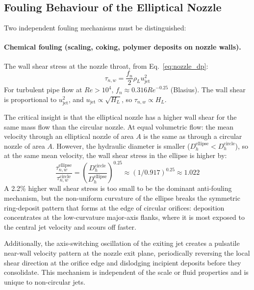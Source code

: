 \documentclass[11pt,letterpaper]{article}
\newcommand{\rhoL}{\rho_L}
\newcommand{\ujet}{u_{\mathrm{jet}}}
\newcommand{\Rey}{\mathit{Re}}
\begin{document}
\subsection{Fouling Behaviour of the Elliptical Nozzle}
\label{sec:fouling}

Two independent fouling mechanisms must be distinguished:

\paragraph{Chemical fouling (scaling, coking, polymer deposits on nozzle walls).}
The wall shear stress at the nozzle throat, from Eq.~\eqref{eq:nozzle_dp}:
\begin{equation}
  \tau_{n,w} = \frac{f_n}{2}\rhoL \ujet^2
  \label{eq:tau_nozzle}
\end{equation}
For turbulent pipe flow at $\Rey > 10^4$, $f_n \approx 0.316\Rey^{-0.25}$
(Blasius).  The wall shear is proportional to $\ujet^2$, and $\ujet
\propto \sqrt{H_L}$, so $\tau_{n,w} \propto H_L$.

The critical insight is that the elliptical nozzle has a higher wall shear
for the same mass flow than the circular nozzle.  At equal volumetric flow:
the mean velocity through an elliptical nozzle of area $A$ is the same as
through a circular nozzle of area $A$.  However, the hydraulic diameter is
smaller ($D_h^{\mathrm{ellipse}} < D_h^{\mathrm{circle}}$), so at the same
mean velocity, the wall shear stress in the ellipse is higher by:
\begin{equation}
  \frac{\tau_{n,w}^{\mathrm{ellipse}}}{\tau_{n,w}^{\mathrm{circle}}}
  = \left(\frac{D_h^{\mathrm{circle}}}{D_h^{\mathrm{ellipse}}}\right)^{0.25}
  \approx (1/0.917)^{0.25} \approx 1.022
  \label{eq:shear_ratio}
\end{equation}
A 2.2\% higher wall shear stress is too small to be the dominant
anti-fouling mechanism, but the non-uniform curvature of the ellipse
breaks the symmetric ring-deposit pattern that forms at the edge of circular
orifices: deposition concentrates at the low-curvature major-axis flanks,
where it is most exposed to the central jet velocity and scours off faster.

Additionally, the axis-switching oscillation of the exiting jet creates a
pulsatile near-wall velocity pattern at the nozzle exit plane, periodically
reversing the local shear direction at the orifice edge and dislodging
incipient deposits before they consolidate.  This mechanism is independent
of the scale or fluid properties and is unique to non-circular jets.
\end{document}
